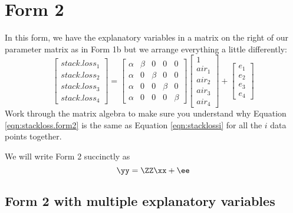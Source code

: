 \section{Form 2}

In this form, we have the explanatory variables in a matrix on the right of our parameter matrix as in Form 1b but we arrange everything a little differently:
\begin{equation}\label{eqn:stackloss.form2}
\begin{bmatrix}stack.loss_1\\stack.loss_2\\stack.loss_3\\stack.loss_4\end{bmatrix}
= 
\begin{bmatrix}
\alpha&\beta&0&0&0\\
\alpha&0&\beta&0&0\\
\alpha&0&0&\beta&0\\
\alpha&0&0&0&\beta
\end{bmatrix}
\begin{bmatrix}1\\air_1\\air_2\\air_3\\air_4\end{bmatrix}
+
\begin{bmatrix}e_1\\e_2\\e_3\\e_4\end{bmatrix}
\end{equation}
Work through the matrix algebra to make sure you understand why Equation \ref{eqn:stackloss.form2} is the same as Equation \ref{eqn:stacklossi} for all the $i$ data points together.

We will write Form 2 succinctly as
\begin{equation}\label{eqn:form2.succinct}
\yy=\ZZ\xx+\ee
\end{equation}

\subsection{Form 2 with multiple explanatory variables}


